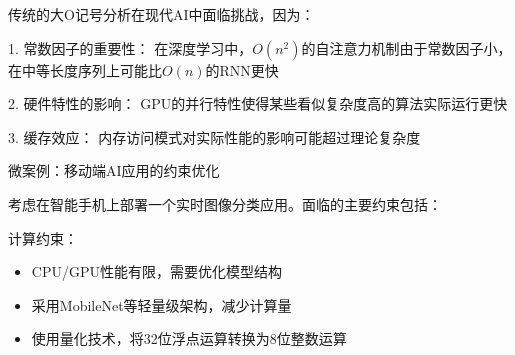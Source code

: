 %
%
%
%
%
%


传统的大O记号分析在现代AI中面临挑战，因为：

1. 常数因子的重要性： 在深度学习中，$O(n^2)$的自注意力机制由于常数因子小，在中等长度序列上可能比$O(n)$的RNN更快

2. 硬件特性的影响： GPU的并行特性使得某些看似复杂度高的算法实际运行更快

3. 缓存效应： 内存访问模式对实际性能的影响可能超过理论复杂度

微案例：移动端AI应用的约束优化

考虑在智能手机上部署一个实时图像分类应用。面临的主要约束包括：

计算约束：
\begin{itemize}
\item CPU/GPU性能有限，需要优化模型结构
\item 采用MobileNet等轻量级架构，减少计算量
\item 使用量化技术，将32位浮点运算转换为8位整数运算
\end{itemize}

